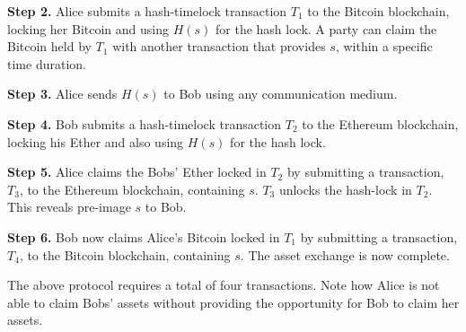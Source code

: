\textbf{Step 2.} Alice submits a hash-timelock transaction $ T_1 $ to the Bitcoin blockchain, locking her Bitcoin and using $ H(s) $ for the hash lock. A party can claim the Bitcoin held by $ T_1 $ with another transaction that provides $ s $, within a specific time duration.

\textbf{Step 3.} Alice sends $ H(s) $ to Bob using any communication medium.

\textbf{Step 4.} Bob submits a hash-timelock transaction $ T_2 $ to the Ethereum blockchain, locking his Ether and also using $ H(s) $ for the hash lock.

\textbf{Step 5.} Alice claims the Bobs' Ether locked in $ T_2 $ by submitting a transaction, $ T_3 $, to the Ethereum blockchain, containing $ s $. $ T_3 $ unlocks the hash-lock in $ T_2 $. This reveals pre-image $ s $ to Bob.

\textbf{Step 6.} Bob now claims Alice's Bitcoin locked in $ T_1 $ by submitting a transaction, $ T_4 $, to the Bitcoin blockchain, containing $ s $. The asset exchange is now complete.

The above protocol requires a total of four transactions.
Note how Alice is not able to claim Bobs' assets without providing the opportunity for Bob to claim her assets.


